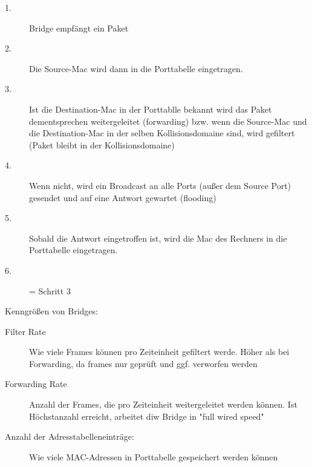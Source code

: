 \documentclass[a4paper,10pt]{scrartcl}
\begin{document}
            \begin{description}
                \item[1.] Bridge empfängt ein Paket
                \item[2.] Die Source-Mac wird dann in die Porttabelle eingetragen.
                \item[3.] Ist die Destination-Mac in der Porttablle bekannt wird das Paket dementsprechen weitergeleitet (forwarding) bzw. wenn die Source-Mac und die Destination-Mac in der
                selben Kollisionsdomaine sind, wird gefiltert (Paket bleibt in der Kollisionsdomaine)
                \item[4.] Wenn nicht, wird ein Broadcast an alle Ports (außer dem Source Port) gesendet und auf eine Antwort gewartet (flooding)
                \item[5.] Sobald die Antwort eingetroffen ist, wird die Mac des Rechners in die Porttabelle eingetragen.
                \item[6.] = Schritt 3 
            \end{description}

            Kenngrößen von Bridges:
            \begin{description}
                \item[Filter Rate] Wie viele Frames können pro Zeiteinheit gefiltert werde. Höher als bei Forwarding, da frames nur geprüft und ggf. verworfen werden
                \item[Forwarding Rate] Anzahl der Frames, die pro Zeiteinheit weitergeleitet werden können. Ist Höchstanzahl erreicht, arbeitet diw Bridge in "full wired speed"
                \item[Anzahl der Adresstabelleneinträge:] Wie viele MAC-Adressen in Porttabelle gespeichert werden können
            \end{description}
\end{document}
